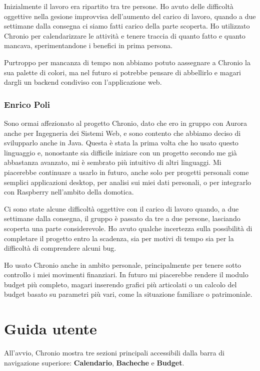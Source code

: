 \documentclass[a4paper,12pt]{report}
\begin{document}
Inizialmente il lavoro era ripartito tra tre persone. Ho avuto delle difficoltà oggettive nella gesione improvvisa dell'aumento del carico di lavoro, quando a due settimane dalla consegna ci siamo fatti carico della parte scoperta. Ho utilizzato Chronio per calendarizzare le attività e tenere traccia di quanto fatto e quanto mancava, sperimentandone i benefici in prima persona.

Purtroppo per  mancanza di tempo non abbiamo potuto aassegnare a Chronio la sua palette di colori, ma nel futuro si potrebbe pensare di abbellirlo e magari dargli un backend condiviso con l'applicazione web.

\subsection*{Enrico Poli}

Sono ormai affezionato al progetto Chronio, dato che ero in gruppo con Aurora
anche per Ingegneria dei Sistemi Web, e sono contento che abbiamo deciso di
svilupparlo anche in Java. Questa è stata la prima volta che ho usato questo
linguaggio e, nonostante sia difficile iniziare con un progetto secondo me già
abbastanza avanzato, mi è sembrato più intuitivo di altri linguaggi. Mi
piacerebbe continuare a usarlo in futuro, anche solo per progetti personali
come semplici applicazioni desktop, per analisi sui miei dati personali, o per
integrarlo con Raspberry nell'ambito della domotica.
 
Ci sono state alcune difficoltà oggettive con il carico di lavoro quando, a due
settimane dalla consegna, il gruppo è passato da tre a due persone, lasciando
scoperta una parte considerevole. Ho avuto qualche incertezza sulla
possibilità di completare il progetto entro la scadenza, sia per motivi di
tempo sia per la difficoltà di comprendere alcuni bug.
 
Ho usato Chronio anche in ambito personale, principalmente per tenere sotto
controllo i miei movimenti finanziari. In futuro mi piacerebbe rendere il
modulo budget più completo, magari inserendo grafici più articolati o un
calcolo del budget basato su parametri più vari, come la situazione familiare
o patrimoniale.

\appendix
\chapter{Guida utente}

All'avvio, Chronio mostra tre sezioni principali accessibili dalla barra di navigazione superiore: \textbf{Calendario}, \textbf{Bacheche} e \textbf{Budget}.
\end{document}
